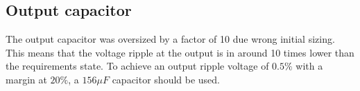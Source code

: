 \subsection{Output capacitor} \label{output_cap_discussion}	
The output capacitor was oversized by a factor of 10 due wrong initial sizing. This means that the voltage ripple at the output is in around 10 times lower than the requirements state. To achieve an output ripple voltage of $0.5\%$ with a margin at $20\%$, a $156\mu F$ capacitor should be used.